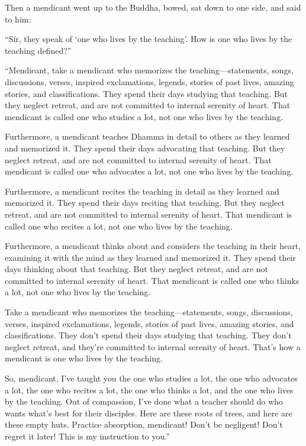 \documentclass[12pt,openany]{book}%
\begin{document}
Then a mendicant went up to the Buddha, bowed, sat down to one side, and said to him: 

“Sir, they speak of ‘one who lives by the teaching’. How is one who lives by the teaching defined?” 

“Mendicant, take a mendicant who memorizes the teaching—statements, songs, discussions, verses, inspired exclamations, legends, stories of past lives, amazing stories, and classifications. They spend their days studying that teaching. But they neglect retreat, and are not committed to internal serenity of heart. That mendicant is called one who studies a lot, not one who lives by the teaching. 

Furthermore, a mendicant teaches Dhamma in detail to others as they learned and memorized it. They spend their days advocating that teaching. But they neglect retreat, and are not committed to internal serenity of heart. That mendicant is called one who advocates a lot, not one who lives by the teaching. 

Furthermore, a mendicant recites the teaching in detail as they learned and memorized it. They spend their days reciting that teaching. But they neglect retreat, and are not committed to internal serenity of heart. That mendicant is called one who recites a lot, not one who lives by the teaching. 

Furthermore, a mendicant thinks about and considers the teaching in their heart, examining it with the mind as they learned and memorized it. They spend their days thinking about that teaching. But they neglect retreat, and are not committed to internal serenity of heart. That mendicant is called one who thinks a lot, not one who lives by the teaching. 

Take a mendicant who memorizes the teaching—statements, songs, discussions, verses, inspired exclamations, legends, stories of past lives, amazing stories, and classifications. They don’t spend their days studying that teaching. They don’t neglect retreat, and they’re committed to internal serenity of heart. That’s how a mendicant is one who lives by the teaching. 

So, mendicant, I’ve taught you the one who studies a lot, the one who advocates a lot, the one who recites a lot, the one who thinks a lot, and the one who lives by the teaching. Out of compassion, I’ve done what a teacher should do who wants what’s best for their disciples. Here are these roots of trees, and here are these empty huts. Practice absorption, mendicant! Don’t be negligent! Don’t regret it later! This is my instruction to you.” 
\end{document}
